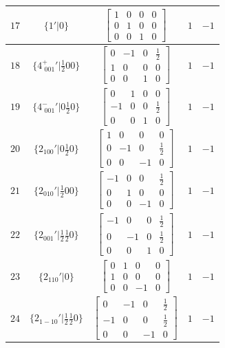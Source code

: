 \documentclass[fleqn,8pt]{jsarticle}
\begin{document}
\begin{longtable}{ccccc}
$ 17 $ & $ \{1{}'|0\} $ & $ \begin{bmatrix} 1 & 0 & 0 & 0 \\ 0 & 1 & 0 & 0 \\ 0 & 0 & 1 & 0 \end{bmatrix} $ & $ 1 $ & $ -1 $ \\ \hline
$ 18 $ & $ \{4^{+}_{\,\,001}{}'|\frac{1}{2} 0 0\} $ & $ \begin{bmatrix} 0 & -1 & 0 & \frac{1}{2} \\ 1 & 0 & 0 & 0 \\ 0 & 0 & 1 & 0 \end{bmatrix} $ & $ 1 $ & $ -1 $ \\ \hline
$ 19 $ & $ \{4^{-}_{\,\,001}{}'|0 \frac{1}{2} 0\} $ & $ \begin{bmatrix} 0 & 1 & 0 & 0 \\ -1 & 0 & 0 & \frac{1}{2} \\ 0 & 0 & 1 & 0 \end{bmatrix} $ & $ 1 $ & $ -1 $ \\ \hline
$ 20 $ & $ \{2{}_{100}{}'|0 \frac{1}{2} 0\} $ & $ \begin{bmatrix} 1 & 0 & 0 & 0 \\ 0 & -1 & 0 & \frac{1}{2} \\ 0 & 0 & -1 & 0 \end{bmatrix} $ & $ 1 $ & $ -1 $ \\ \hline
$ 21 $ & $ \{2{}_{010}{}'|\frac{1}{2} 0 0\} $ & $ \begin{bmatrix} -1 & 0 & 0 & \frac{1}{2} \\ 0 & 1 & 0 & 0 \\ 0 & 0 & -1 & 0 \end{bmatrix} $ & $ 1 $ & $ -1 $ \\ \hline
$ 22 $ & $ \{2{}_{001}{}'|\frac{1}{2} \frac{1}{2} 0\} $ & $ \begin{bmatrix} -1 & 0 & 0 & \frac{1}{2} \\ 0 & -1 & 0 & \frac{1}{2} \\ 0 & 0 & 1 & 0 \end{bmatrix} $ & $ 1 $ & $ -1 $ \\ \hline
$ 23 $ & $ \{2{}_{110}{}'|0\} $ & $ \begin{bmatrix} 0 & 1 & 0 & 0 \\ 1 & 0 & 0 & 0 \\ 0 & 0 & -1 & 0 \end{bmatrix} $ & $ 1 $ & $ -1 $ \\ \hline
$ 24 $ & $ \{2{}_{1-10}{}'|\frac{1}{2} \frac{1}{2} 0\} $ & $ \begin{bmatrix} 0 & -1 & 0 & \frac{1}{2} \\ -1 & 0 & 0 & \frac{1}{2} \\ 0 & 0 & -1 & 0 \end{bmatrix} $ & $ 1 $ & $ -1 $ \\ \hline

\end{longtable}
\end{document}
